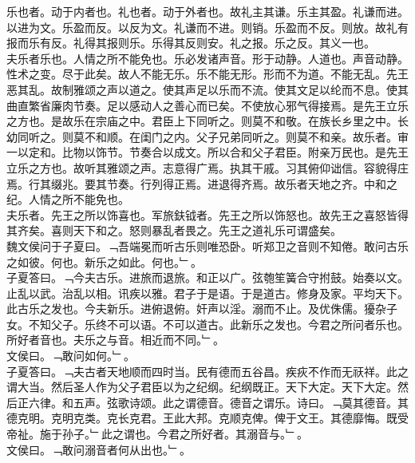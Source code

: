 \documentclass{zhvt-classic}
\begin{document}
\hspace*{2em}乐也者。动于内者也。礼也者。动于外者也。故礼主其谦。乐主其盈。礼谦而进。以进为文。乐盈而反。以反为文。礼谦而不进。则销。乐盈而不反。则放。故礼有报而乐有反。礼得其报则乐。乐得其反则安。礼之报。乐之反。其义一也。\\
\hspace*{2em}夫乐者乐也。人情之所不能免也。乐必发诸声音。形于动静。人道也。声音动静。性术之变。尽于此矣。故人不能无乐。乐不能无形。形而不为道。不能无乱。先王恶其乱。故制雅颂之声以道之。使其声足以乐而不流。使其文足以纶而不息。使其曲直繁省廉肉节奏。足以感动人之善心而已矣。不使放心邪气得接焉。是先王立乐之方也。是故乐在宗庙之中。君臣上下同听之。则莫不和敬。在族长乡里之中。长幼同听之。则莫不和顺。在闺门之内。父子兄弟同听之。则莫不和亲。故乐者。审一以定和。比物以饰节。节奏合以成文。所以合和父子君臣。附亲万民也。是先王立乐之方也。故听其雅颂之声。志意得广焉。执其干戚。习其俯仰诎信。容貌得庄焉。行其缀兆。要其节奏。行列得正焉。进退得齐焉。故乐者天地之齐。中和之纪。人情之所不能免也。\\
\hspace*{2em}夫乐者。先王之所以饰喜也。军旅鈇钺者。先王之所以饰怒也。故先王之喜怒皆得其齐矣。喜则天下和之。怒则暴乱者畏之。先王之道礼乐可谓盛矣。\\
\hspace*{2em}魏文侯问于子夏曰。﹁吾端冕而听古乐则唯恐卧。听郑卫之音则不知倦。敢问古乐之如彼。何也。新乐之如此。何也。﹂。\\
\hspace*{2em}子夏答曰。﹁今夫古乐。进旅而退旅。和正以广。弦匏笙簧合守拊鼓。始奏以文。止乱以武。治乱以相。讯疾以雅。君子于是语。于是道古。修身及家。平均天下。此古乐之发也。今夫新乐。进俯退俯。奸声以淫。溺而不止。及优侏儒。獶杂子女。不知父子。乐终不可以语。不可以道古。此新乐之发也。今君之所问者乐也。所好者音也。夫乐之与音。相近而不同。﹂。\\
\hspace*{2em}文侯曰。﹁敢问如何。﹂。\\
\hspace*{2em}子夏答曰。﹁夫古者天地顺而四时当。民有德而五谷昌。疾疢不作而无祆祥。此之谓大当。然后圣人作为父子君臣以为之纪纲。纪纲既正。天下大定。天下大定。然后正六律。和五声。弦歌诗颂。此之谓德音。德音之谓乐。诗曰。﹁莫其德音。其德克明。克明克类。克长克君。王此大邦。克顺克俾。俾于文王。其德靡悔。既受帝祉。施于孙子。﹂此之谓也。今君之所好者。其溺音与。﹂。\\
\hspace*{2em}文侯曰。﹁敢问溺音者何从出也。﹂。\\
\end{document}
